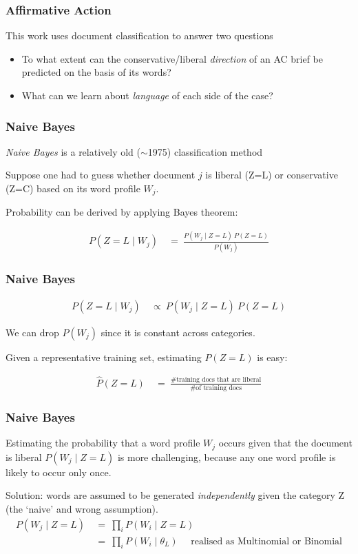 \documentclass[11pt,compress,professionalfonts]{beamer}
\newcommand{\ita}{\begin{itemize}}
\newcommand{\itm}{\item[]}
\newcommand{\itz}{\end{itemize}}
\begin{document}
\begin{frame}[t,fragile]\frametitle{Affirmative Action}

This work uses document classification to answer two questions
\ita
\itm To what extent can the conservative/liberal \textsl{direction} of an AC brief be predicted on the basis of its words?
\itm What can we learn about \textsl{language} of each side of the case?
\itz

\end{frame}
\begin{frame}[t,fragile]\frametitle{Naive Bayes}

\textsl{Naive Bayes} is a relatively old ($\sim$1975)  classification method

Suppose one had to guess  whether document $j$ is liberal (Z=L) or conservative (Z=C) based on its word profile $W_j$.

Probability can be derived by applying Bayes theorem:

\begin{align*}
P(Z=L \mid W_j) &~=~ \frac{P(W_j \mid Z=L)~P(Z=L)}{P(W_j)}
\end{align*}

\end{frame}
\begin{frame}[t,fragile]\frametitle{Naive Bayes}

\begin{align*}
P(Z=L \mid W_j) &~\propto~ P(W_j \mid Z=L)~P(Z=L)
\end{align*}

We can drop $P(W_j)$ since it is constant across categories.

Given a representative training set, estimating $P(Z=L)$ is easy:

\begin{align*}
\hat{P}(Z=L)&~=~ \frac{\text{\# training docs that are liberal}}
{\text{\# of training docs}}
\end{align*}

\end{frame}
\begin{frame}[t,fragile]\frametitle{Naive Bayes}

Estimating the probability that a word profile $W_j$ occurs given that the document is liberal $P(W_j\mid Z=L)$ is more challenging, because any one word profile is likely to occur only once.

Solution: words are assumed to be generated \textit{independently} given the category Z (the `naive' and wrong assumption).
\begin{align*}
P(W_j \mid Z=L) &~=~ \prod_i P(W_i \mid Z=L)\\
&~=~ \prod_i P(W_i \mid \theta_L) ~~~~~~\text{realised as Multinomial or Binomial}
\end{align*}
\newpage

\end{frame}
\end{document}
